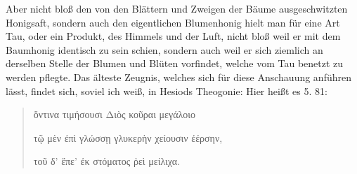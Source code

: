 \documentclass[a4paper, 11pt, oneside]{article}
\begin{document}
Aber nicht bloß den von den Blättern und Zweigen der Bäume ausgeschwitzten Honigsaft, sondern auch den eigentlichen Blumenhonig hielt man für eine Art Tau, oder ein Produkt, des Himmels und der Luft, nicht bloß weil er mit dem Baumhonig identisch zu sein schien, sondern auch weil er sich ziemlich an derselben Stelle der Blumen und Blüten vorfindet, welche vom Tau benetzt zu werden pflegte. Das älteste Zeugnis, welches sich für diese Anschauung anführen lässt, findet sich, soviel ich weiß, in Hesiods Theogonie: Hier heißt es 5. 81:
\begin{quotation}
ὅντινα τιμήσουσι Διὸς κοῦραι μεγάλοιο

τῷ μὲν ἐπὶ γλώσσῃ γλυκερὴν χείουσιν ἐέρσην,

τοῦ δ' ἔπε' ἐκ στόματος ῥεὶ μείλιχα.
\end{quotation}
\paragraph{}
\end{document}

